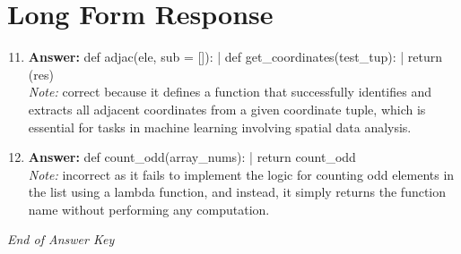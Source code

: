 \documentclass[12pt]{article}
\begin{document}
\section*{Long Form Response}
\begin{enumerate}[label=\arabic*.]
\setcounter{enumi}{10}
\item \textbf{Answer:} def adjac(ele, sub = []): | def get\_coordinates(test\_tup): | return (res)
\\ \textit{Note:} correct because it defines a function that successfully identifies and extracts all adjacent coordinates from a given coordinate tuple, which is essential for tasks in machine learning involving spatial data analysis.
\item \textbf{Answer:} def count\_odd(array\_nums): | return count\_odd
\\ \textit{Note:} incorrect as it fails to implement the logic for counting odd elements in the list using a lambda function, and instead, it simply returns the function name without performing any computation.
\end{enumerate}

\vfill
\noindent\textit{End of Answer Key}
\end{document}
